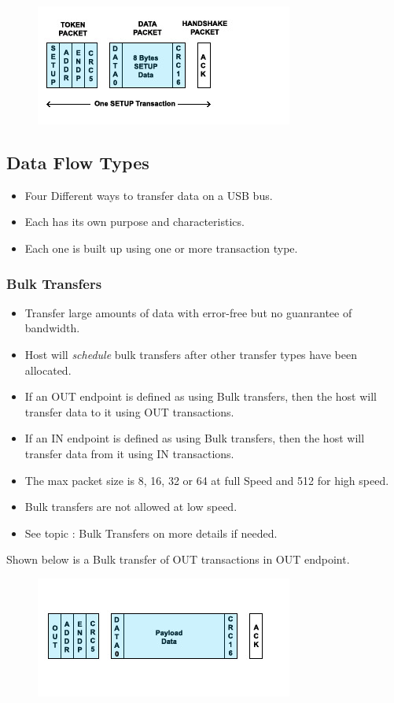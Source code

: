 \documentclass{article}
\begin{document}
\begin{figure}[H]
    \centering
    \includegraphics[]{DocuResources/SETUPtrans.jpg}
\end{figure}

\subsection{Data Flow Types}
\begin{itemize}
    \item Four Different ways to transfer data on a USB bus.
    \item Each has its own purpose and characteristics.
    \item Each one is built up using one or more transaction type.
\end{itemize}


\subsubsection{Bulk Transfers}
\begin{itemize}
    \item Transfer large amounts of data with error-free but no guanrantee of bandwidth.
    \item Host will \textit{schedule} bulk transfers after other transfer types have been allocated.
    \item If an OUT endpoint is defined as using Bulk transfers, then the host will transfer data to it using OUT transactions.
    \item If an IN endpoint is defined as using Bulk transfers, then the host will transfer data from it using IN transactions.
    \item The max packet size is 8, 16, 32 or 64 at full Speed and 512 for high speed.
    \item Bulk transfers are not allowed at low speed.
    \item See topic : Bulk Transfers on more details if needed.
\end{itemize}

Shown below is a Bulk transfer of OUT transactions in OUT endpoint.
\begin{figure}[H]
    \centering
    \includegraphics[]{DocuResources/BulkOUTTrans.jpg}
\end{figure}
\end{document}
